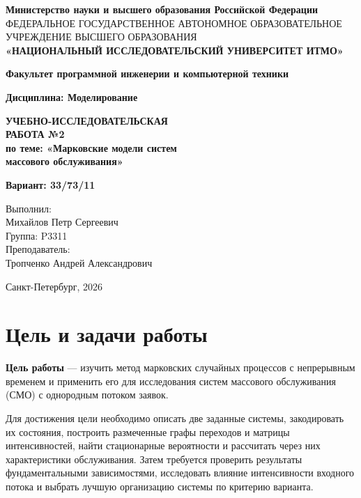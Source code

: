 \documentclass[a4paper,12pt]{article}
\begin{document}
\begin{titlepage}
\centering
{\fontsize{11}{13}\selectfont\textbf{Министерство науки и высшего образования Российской Федерации}}\\
{\fontsize{7}{10}\selectfont ФЕДЕРАЛЬНОЕ ГОСУДАРСТВЕННОЕ АВТОНОМНОЕ ОБРАЗОВАТЕЛЬНОЕ УЧРЕЖДЕНИЕ ВЫСШЕГО ОБРАЗОВАНИЯ}\\
\vspace{.2cm}
{\fontsize{14}{17}\selectfont\textbf{«НАЦИОНАЛЬНЫЙ ИССЛЕДОВАТЕЛЬСКИЙ УНИВЕРСИТЕТ ИТМО»}}
\vspace{1cm}

{\fontsize{12}{14}\selectfont\textbf{Факультет программной инженерии и компьютерной техники}}
\vspace{1cm}

{\fontsize{12}{14}\selectfont\textbf{Дисциплина: Моделирование}}
\vspace*{\fill}

{\fontsize{18}{22}\selectfont\textbf{УЧЕБНО-ИССЛЕДОВАТЕЛЬСКАЯ\\РАБОТА №2}}\\
\vspace{.5cm}
{\fontsize{14}{17}\selectfont\textbf{по теме: «Марковские модели систем\\массового обслуживания»}}
\vspace{1.5cm}

{\fontsize{12}{14}\selectfont\textbf{Вариант: 33/73/11}}
\vspace{1.5cm}
\begin{flushright}
\fontsize{12}{14}\selectfont
Выполнил:\\
Михайлов Петр Сергеевич\\
Группа: P3311\\[1em]
Преподаватель:\\
Тропченко Андрей Александрович
\end{flushright}
\vfill
{\fontsize{12}{14}\selectfont Санкт-Петербург, 2026}
\end{titlepage}
\setcounter{page}{2}
{\small\setlength{\parskip}{0pt}\tableofcontents}
\newpage

\section{Цель и задачи работы}
\textbf{Цель работы} --- изучить метод марковских случайных процессов с непрерывным временем и применить его для исследования систем массового обслуживания (СМО) с однородным потоком заявок.

Для достижения цели необходимо описать две заданные системы, закодировать их состояния, построить размеченные графы переходов и матрицы интенсивностей, найти стационарные вероятности и рассчитать через них характеристики обслуживания. Затем требуется проверить результаты фундаментальными зависимостями, исследовать влияние интенсивности входного потока и выбрать лучшую организацию системы по критерию варианта.
\end{document}
